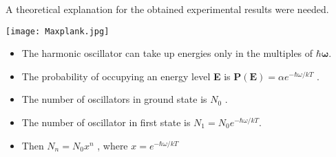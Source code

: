 \documentclass[aspectratio=169]{beamer}
\begin{document}
\begin{frame}{}

	\begin{multicols}{2}
	
\begin{center}

 {\large A theoretical explanation for the obtained experimental results were needed. }

\end{center}
 
	\columnbreak

		\begin{center}	
	
	 		\texttt{[image: Maxplank.jpg]}
	 
		\end{center}
	
	\end{multicols}
				
\end{frame}

\begin{frame}{}

	\begin{itemize}

		\item The harmonic oscillator can take up energies only in the multiples of $ \mathbf{\hbar \omega} $.  \newline
		\item The probability of occupying an energy level \textbf{E} is {\large $\mathbf{P(E)} = \alpha e^{-\hbar \omega / kT}$} . 
	\end{itemize}
	
\end{frame}

\begin{frame}

	\begin{itemize}
	
		\item The number of oscillators in ground state is $ N_0 $ . \newline
		\item The number of oscillator in first state is $ N_1 = N_0  e^{-\hbar \omega / kT} $.  \vspace{0.5cm}
		\item Then $ N_n = N_0 x^n $ , where $ x = e^{-\hbar \omega / kT} $
	
	\end{itemize}
	
\end{frame}
\end{document}

